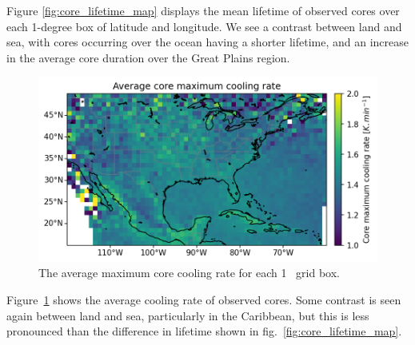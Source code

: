 Figure \ref{fig:core_lifetime_map} displays the mean lifetime of observed cores over each 1-degree box of latitude and longitude.
We see a contrast between land and sea, with cores occurring over the ocean having a shorter lifetime, and an increase in the average core duration over the Great Plains region.

\begin{figure}[tp]
    \centering
    \includegraphics[width=\textwidth]{figures/ch2_08.png}
    \caption[
    The average maximum core cooling rate
    ]{
    The average maximum core cooling rate for each 1
    \textdegree\ grid box.
    }
    \label{fig:core_cooling_rate_map}
\end{figure}

Figure~\ref{fig:core_cooling_rate_map} shows the average cooling rate of observed cores.
Some contrast is seen again between land and sea, particularly in the Caribbean, but this is less pronounced than the difference in lifetime shown in fig.~\ref{fig:core_lifetime_map}.



